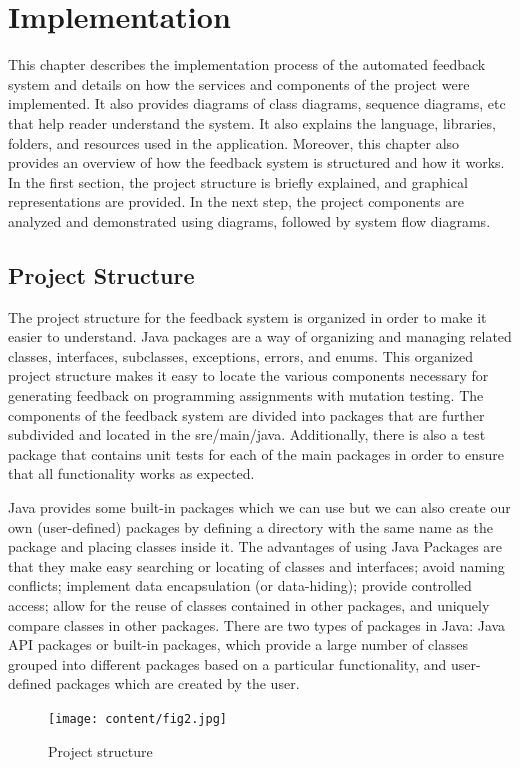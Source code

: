\chapter{Implementation}
\label{chapter: Implementation}
This chapter describes the implementation process of the automated feedback system and details on how the services and components of the project were implemented. It also provides diagrams of class diagrams, sequence diagrams, etc that help reader understand the system. It also explains the language, libraries, folders, and resources used in the application. Moreover, this chapter also provides an overview of how the feedback system is structured and how it works.
\newline
In the first section, the project structure is briefly explained, and graphical representations are provided. In the next step, the project components are analyzed and demonstrated using diagrams, followed by system flow diagrams.

\section{Project Structure}
The project structure for the feedback system is organized in order to make it easier to understand. Java packages are a way of organizing and managing related classes, interfaces, subclasses, exceptions, errors, and enums. This organized project structure makes it easy to locate the various components necessary for generating feedback on programming assignments with mutation testing. The components of the feedback system are divided into packages that are further subdivided and located in the sre/main/java. Additionally, there is also a test package that contains unit tests for each of the main packages in order to ensure that all functionality works as expected. \par

Java provides some built-in packages which we can use but we can also create our own (user-defined) packages by defining a directory with the same name as the package and placing classes inside it. The advantages of using Java Packages are that they make easy searching or locating of classes and interfaces; avoid naming conflicts; implement data encapsulation (or data-hiding); provide controlled access; allow for the reuse of classes contained in other packages, and uniquely compare classes in other packages. There are two types of packages in Java: Java API packages or built-in packages, which provide a large number of classes grouped into different packages based on a particular functionality, and user-defined packages which are created by the user.
\newpage
\begin{figure}[h!]
	\centering
\texttt{[image: content/fig2.jpg]}
	\caption{Project structure}
	\label{fig:f12}
 \end{figure}

